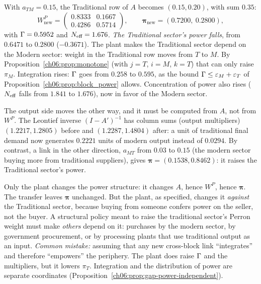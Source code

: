 \documentclass[../solutions_manual.tex]{subfiles}
\begin{document}
 With $a_{TM} = 0.15$, the Traditional row of $A$ becomes $(0.15, 0.20)$, with sum $0.35$:
\[
W^P_{\text{new}} = \begin{pmatrix} 0.8333 & 0.1667 \\ 0.4286 & 0.5714\end{pmatrix}, \qquad \boldsymbol{\pi}_{\text{new}} = (0.7200,\ 0.2800),
\]
with $\Gamma = 0.5952$ and $N_{\text{eff}} = 1.676$.
\emph{The Traditional sector's power falls}, from $0.6471$ to $0.2800$ ($-0.3671$). The plant makes the Traditional sector depend on the Modern sector: weight in the Traditional row moves from $T$ to $M$. By Proposition~\ref{ch06:prop:monotone} (with $j = T$, $i = M$, $k = T$) that can only raise $\pi_M$. Integration rises: $\Gamma$ goes from $0.258$ to $0.595$, as the bound $\Gamma \le \varepsilon_M + \varepsilon_T$ of Proposition~\ref{ch06:prop:block_power} allows. Concentration of power also rises ($N_{\text{eff}}$ falls from $1.841$ to $1.676$), now in favor of the Modern sector.

The output side moves the other way, and it must be computed from $A$, not from $W^P$. The Leontief inverse $(I - A')^{-1}$ has column sums (output multipliers) $(1.2217, 1.2805)$ before and $(1.2287, 1.4804)$ after: a unit of traditional final demand now generates $0.2221$ units of modern output instead of $0.0294$. By contrast, a link in the other direction, $a_{MT}$ from $0.03$ to $0.15$ (the modern sector buying more from traditional suppliers), gives $\boldsymbol{\pi} = (0.1538, 0.8462)$: it raises the Traditional sector's power.

 Only the plant changes the power structure: it changes $A$, hence $W^P$, hence $\boldsymbol{\pi}$. The transfer leaves $\boldsymbol{\pi}$ unchanged. But the plant, as specified, changes it \emph{against} the Traditional sector, because buying from someone confers power on the seller, not the buyer. A structural policy meant to raise the traditional sector's Perron weight must make \emph{others} depend on it: purchases by the modern sector, by government procurement, or by processing plants that use traditional output as an input. \emph{Common mistake:} assuming that any new cross-block link ``integrates'' and therefore ``empowers'' the periphery. The plant does raise $\Gamma$ and the multipliers, but it lowers $\pi_T$. Integration and the distribution of power are separate coordinates (Proposition~\ref{ch06:prop:gap-power-independent}).
\end{document}
